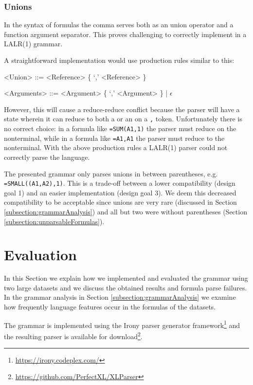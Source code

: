 \documentclass[conference]{IEEEtran}
\begin{document}
\subsubsection{\textbf{Unions}}
\label{subsec:desing:unions}

In the syntax of formulas the comma serves both as an union operator and a function argument separator.
This proves challenging to correctly implement in a LALR(1) grammar.

A straightforward implementation would use production rules similar to this:
\begin{grammar}
<Union> ::= <Reference> \{ `,' <Reference> \}

<Arguments> ::= <Argument> \{ `,' <Argument> \} | $\epsilon$
\end{grammar}

However, this will cause a reduce-reduce conflict because the parser will have a state wherein it can reduce to both a  or an  on a \texttt{,} token.
Unfortunately there is no correct choice: in a formula like \texttt{=SUM(A1,1)} the parser must reduce on the  nonterminal, while in a formula like \texttt{=A1,A1} the parser must reduce to the  nonterminal.
With the above production rules a LALR(1) parser could not correctly parse the language.

The presented grammar only parses unions in between parentheses, e.g. \texttt{=SMALL((A1,A2),1)}.
This is a trade-off between a lower compatibility (design goal 1) and an easier implementation (design goal 3).
We deem this decreased compatibility to be acceptable since unions are very rare (discussed in Section \ref{subsection:grammarAnalysis}) and all but two were without parentheses (Section \ref{subsection:unparsableFormulas}).

\section{Evaluation}
\label{sec:evaluation}

In this Section we explain how we implemented and evaluated the grammar using two large datasets and we discuss the obtained results and formula parse failures. In the grammar analysis in Section \ref{subsection:grammarAnalysis} we examine how frequently language features occur in the formulas of the datasets.

The grammar is implemented using the Irony parser generator framework\footnote{\url{https://irony.codeplex.com/}} and the resulting parser is available for download\footnote{\url{https://github.com/PerfectXL/XLParser}}.
\end{document}
